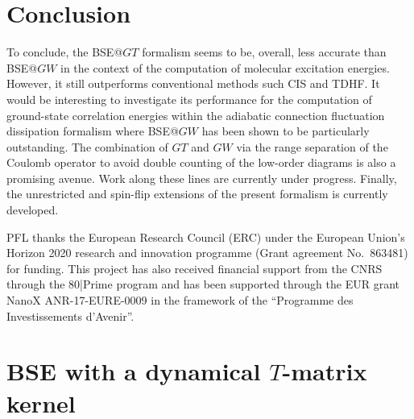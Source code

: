 \documentclass[aip,jcp,reprint,noshowkeys,superscriptaddress]{revtex4-1}
\begin{document}
\section{Conclusion}
\label{sec:ccl}
To conclude, the BSE@$GT$ formalism seems to be, overall, less accurate than BSE@$GW$ in the context of the computation of molecular excitation energies.
However, it still outperforms conventional methods such CIS and TDHF.
It would be interesting to investigate its performance for the computation of ground-state correlation energies within the adiabatic connection fluctuation dissipation formalism where BSE@$GW$ has been shown to be particularly outstanding. \cite{Maggio_2016,Holzer_2018b,Loos_2020e}
The combination of $GT$ and $GW$ via the range separation of the Coulomb operator to avoid double counting of the low-order diagrams is also a promising avenue.
Work along these lines are currently under progress.
Finally, the unrestricted and spin-flip extensions of the present formalism is currently developed.

\begin{acknowledgements}
PFL thanks the European Research Council (ERC) under the European Union's Horizon 2020 research and innovation programme (Grant agreement No.~863481) for funding.
This project has also received financial support from the CNRS through the 80|Prime program and has been supported through the EUR grant NanoX ANR-17-EURE-0009 in the framework of the ``Programme des Investissements d’Avenir''.
\end{acknowledgements}

\onecolumngrid
\appendix
\section{BSE with a dynamical $T$-matrix kernel}
\end{document}
